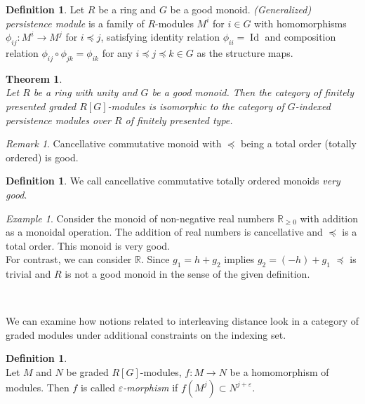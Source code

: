 \documentclass[english,12pt]{article}
\newcounter{stmcounter}[section]
\newcounter{thcounter}
\numberwithin{equation}{section}
\newtheorem{theorem}[thcounter]{Theorem}
\theoremstyle{definition}
\newtheorem{definition}[stmcounter]{Definition}
\theoremstyle{remark}
\newtheorem{remark}[stmcounter]{Remark}
\newtheorem{example}[stmcounter]{Example}
\newcommand{\define}[1]{{\textit{#1}}}
\renewcommand{\geq}{\geqslant}
\begin{document}
\begin{definition} {\cite[Definition 12]{Corbet18}}
  Let $R$ be a ring and $G$ be a good monoid. \define{(Generalized) persistence module} is a family of $R$-modules $M^i$ for $i \in G$ with homomorphisms $\phi_{ij} : M^i \to M^j$ for $i \preceq j$, satisfying identity relation $\phi_{ii} = \operatorname{Id}$ and composition relation $\phi_{ij} \circ \phi_{jk} = \phi_{ik}$ for any $i \preceq j \preceq k \in G$ as the structure maps.
\end{definition}

\begin{theorem} {\cite[Theorem 21]{Corbet18}}\\
  Let $R$ be a ring with unity and $G$ be a good monoid. Then the category of finitely presented graded $R[G]$-modules is isomorphic to the category of $G$-indexed persistence modules over $R$ of finitely presented type.
\end{theorem}

\begin{remark}
  Cancellative commutative monoid with $\preceq$ being a total order (totally ordered) is good.
\end{remark}

\begin{definition}
  We call cancellative commutative totally ordered monoids \define{very good}.
\end{definition}

\begin{example}
  Consider the monoid of non-negative real numbers $\mathbb{R}_{\geq 0}$ with addition as a monoidal operation. The addition of real numbers is cancellative and $\preceq$ is a total order. This monoid is very good.\\

  For contrast, we can consider $\mathbb{R}$. Since $g_1 = h + g_2$ implies $g_2 = (-h) + g_1$ $\preceq$ is trivial and $R$ is not a good monoid in the sense of the given definition.
\end{example} ~ \par

We can examine how notions related to interleaving distance look in a category of graded modules under additional constraints on the indexing set.

\begin{definition} {\cite[Definition 2.7]{GS16}}\\
  Let $M$ and $N$ be graded $R[G]$-modules, $f : M \to N$ be a homomorphism of modules. Then $f$ is called \define{$\varepsilon$-morphism} if $f(M^j) \subset N^{j+\varepsilon}$.
\end{definition}
\end{document}
